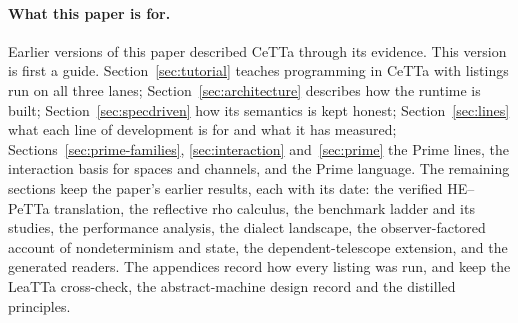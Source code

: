 \documentclass[11pt]{article}
\newcommand{\PeTTa}{\textup{PeTTa}}
\newcommand{\HE}{\textup{HE}}
\newcommand{\CeTTa}{\textup{CeTTa}}
\newcommand{\LeaTTa}{\textup{LeaTTa}}
\begin{document}
\paragraph{What this paper is for.}  Earlier versions of this paper described
\CeTTa{} through its evidence.  This version is first a guide.
Section~\ref{sec:tutorial} teaches programming in \CeTTa{} with listings run
on all three lanes; Section~\ref{sec:architecture} describes how the runtime
is built; Section~\ref{sec:specdriven} how its semantics is kept honest;
Section~\ref{sec:lines} what each line of development is for and what it has
measured; Sections~\ref{sec:prime-families}, \ref{sec:interaction}
and~\ref{sec:prime} the Prime lines, the interaction basis for spaces and
channels, and the Prime language.  The remaining sections keep the paper's
earlier results, each with its date: the verified \HE{}--\PeTTa{} translation,
the reflective rho calculus, the benchmark ladder and its studies, the
performance analysis, the dialect landscape, the observer-factored account of
nondeterminism and state, the dependent-telescope extension, and the generated
readers.  The appendices record how every listing was run, and keep the
\LeaTTa{} cross-check, the abstract-machine design record and the distilled
principles.
\end{document}
